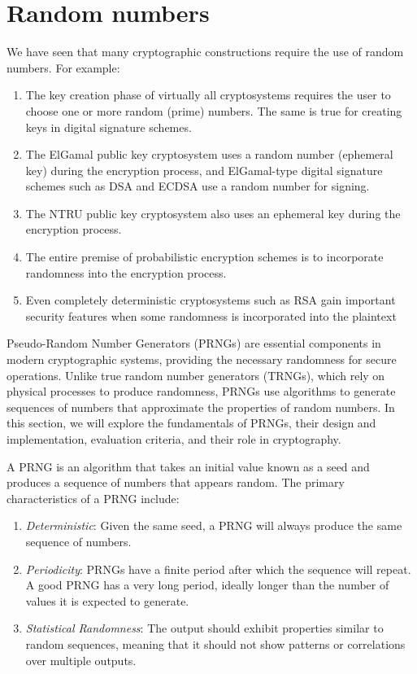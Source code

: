 \documentclass[a4paper, 12pt]{book} %
\begin{document}
\chapter{Random numbers}
\label{ch:random}

We have seen that many cryptographic constructions require the use of random numbers. For example:
\begin{enumerate}
    \item The key creation phase of virtually all cryptosystems requires the user to choose one or more random (prime) numbers. The same is true for creating keys in digital signature schemes.
    \item The ElGamal public key cryptosystem uses a random number (ephemeral key) during the encryption process, and ElGamal-type digital signature schemes such as DSA and ECDSA use a random number for signing.
    \item The NTRU public key cryptosystem also uses an ephemeral key during the encryption process.
    \item The entire premise of probabilistic encryption schemes is to incorporate randomness into the encryption process.
    \item Even completely deterministic cryptosystems such as RSA gain important security features when some randomness is incorporated into the plaintext
\end{enumerate}

Pseudo-Random Number Generators (PRNGs) are essential components in modern cryptographic systems, providing the necessary randomness for secure operations. Unlike true random number generators (TRNGs), which rely on physical processes to produce randomness, PRNGs use algorithms to generate sequences of numbers that approximate the properties of random numbers. In this section, we will explore the fundamentals of PRNGs, their design and implementation, evaluation criteria, and their role in cryptography.


A PRNG is an algorithm that takes an initial value known as a seed and produces a sequence of numbers that appears random. The primary characteristics of a PRNG include:
\begin{enumerate}
    \item \emph{Deterministic}: Given the same seed, a PRNG will always produce the same sequence of numbers.
    \item \emph{Periodicity}: PRNGs have a finite period after which the sequence will repeat. A good PRNG has a very long period, ideally longer than the number of values it is expected to generate.
    \item \emph{Statistical Randomness}: The output should exhibit properties similar to random sequences, meaning that it should not show patterns or correlations over multiple outputs.
\end{enumerate}
\end{document}
